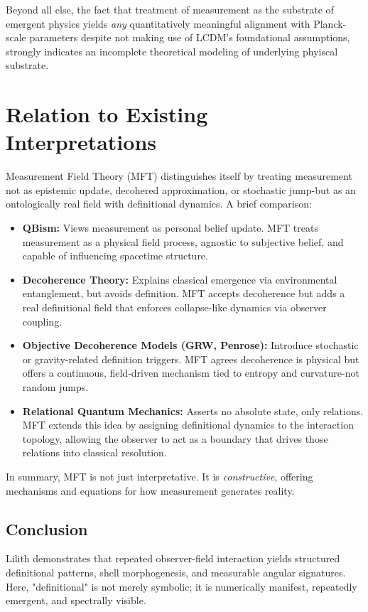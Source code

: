 Beyond all else, the fact that treatment of measurement as the substrate of emergent physics yields \textit{any} quantitatively meaningful alignment with Planck-scale parameters despite not making use of LCDM's foundational assumptions, strongly indicates an incomplete theoretical modeling of underlying phyiscal substrate.  

\section*{Relation to Existing Interpretations}

Measurement Field Theory (MFT) distinguishes itself by treating measurement not as epistemic update, decohered approximation, or stochastic jump-but as an ontologically real field with definitional dynamics. A brief comparison:

\begin{itemize}
  \item \textbf{QBism:} Views measurement as personal belief update. MFT treats measurement as a physical field process, agnostic to subjective belief, and capable of influencing spacetime structure.

  \item \textbf{Decoherence Theory:} Explains classical emergence via environmental entanglement, but avoids definition. MFT accepts decoherence but adds a real definitional field that enforces collapse-like dynamics via observer coupling.

  \item \textbf{Objective Decoherence Models (GRW, Penrose):} Introduce stochastic or gravity-related definition triggers. MFT agrees decoherence is physical but offers a continuous, field-driven mechanism tied to entropy and curvature-not random jumps.

  \item \textbf{Relational Quantum Mechanics:} Asserts no absolute state, only relations. MFT extends this idea by assigning definitional dynamics to the interaction topology, allowing the observer to act as a boundary that drives those relations into classical resolution.
\end{itemize}

In summary, MFT is not just interpretative. It is \textit{constructive}, offering mechanisms and equations for how measurement generates reality.


\subsection{Conclusion}
Lilith demonstrates that repeated observer-field interaction yields structured definitional patterns, shell morphogenesis, and measurable angular signatures. Here, "definitional" is not merely symbolic; it is numerically manifest, repeatedly emergent, and spectrally visible.


